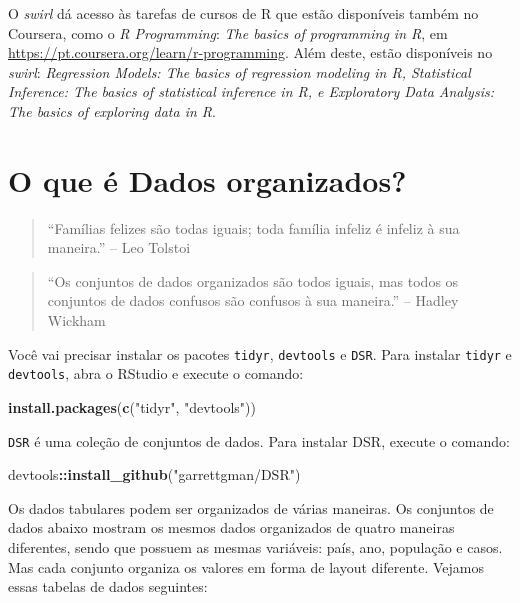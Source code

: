 \documentclass[]{book}
\newenvironment{Shaded}{\begin{snugshade}}{\end{snugshade}}
\newcommand{\KeywordTok}[1]{\textcolor[rgb]{0.13,0.29,0.53}{\textbf{#1}}}
\newcommand{\NormalTok}[1]{#1}
\newcommand{\OperatorTok}[1]{\textcolor[rgb]{0.81,0.36,0.00}{\textbf{#1}}}
\newcommand{\StringTok}[1]{\textcolor[rgb]{0.31,0.60,0.02}{#1}}
\begin{document}
O \emph{swirl} dá acesso às tarefas de cursos de R que estão disponíveis também no Coursera, como o \emph{R Programming}: \emph{The basics of programming in R}, em \url{https://pt.coursera.org/learn/r-programming}. Além deste, estão
disponíveis no \emph{swirl}: \emph{Regression Models: The basics of regression modeling in R, Statistical Inference: The basics of statistical inference in R, e Exploratory Data Analysis: The basics of exploring data in R}.

\hypertarget{literature}{%
\chapter{O que é Dados organizados?}\label{literature}}

\begin{quote}
``Famílias felizes são todas iguais; toda família infeliz é infeliz à sua maneira.'' -- Leo Tolstoi
\end{quote}

\begin{quote}
``Os conjuntos de dados organizados são todos iguais, mas todos os conjuntos de dados confusos são confusos à sua maneira.'' -- Hadley Wickham
\end{quote}

Você vai precisar instalar os pacotes \texttt{tidyr}, \texttt{devtools} e \texttt{DSR}. Para instalar \texttt{tidyr} e \texttt{devtools}, abra o RStudio e execute o comando:

\begin{Shaded}
\begin{Highlighting}[]
\KeywordTok{install.packages}\NormalTok{(}\KeywordTok{c}\NormalTok{(}\StringTok{"tidyr"}\NormalTok{, }\StringTok{"devtools"}\NormalTok{))}
\end{Highlighting}
\end{Shaded}

\texttt{DSR} é uma coleção de conjuntos de dados. Para instalar DSR, execute o comando:

\begin{Shaded}
\begin{Highlighting}[]
\NormalTok{devtools}\OperatorTok{::}\KeywordTok{install_github}\NormalTok{(}\StringTok{"garrettgman/DSR"}\NormalTok{)}
\end{Highlighting}
\end{Shaded}

Os dados tabulares podem ser organizados de várias maneiras. Os conjuntos de dados abaixo mostram os mesmos dados organizados de quatro maneiras diferentes, sendo que possuem as mesmas variáveis: país, ano, população e casos. Mas cada conjunto organiza os valores em forma de layout diferente. Vejamos essas tabelas de dados seguintes:
\end{document}
